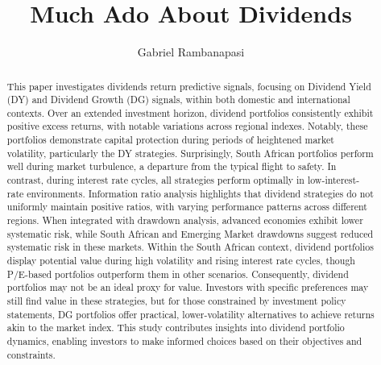 \documentclass[11pt,preprint, authoryear]{elsarticle}
\numberwithin{equation}{section}
\numberwithin{figure}{section}
\numberwithin{table}{section}
\begin{document}
\begin{frontmatter}  %

\title{Much Ado About Dividends}





\author[Add1]{Gabriel Rambanapasi}





\address[Add1]{Stellenbosch University, Cape Town, South Africa}


\begin{abstract}
\small{
This paper investigates dividends return predictive signals, focusing on
Dividend Yield (DY) and Dividend Growth (DG) signals, within both
domestic and international contexts. Over an extended investment
horizon, dividend portfolios consistently exhibit positive excess
returns, with notable variations across regional indexes. Notably, these
portfolios demonstrate capital protection during periods of heightened
market volatility, particularly the DY strategies. Surprisingly, South
African portfolios perform well during market turbulence, a departure
from the typical flight to safety. In contrast, during interest rate
cycles, all strategies perform optimally in low-interest-rate
environments. Information ratio analysis highlights that dividend
strategies do not uniformly maintain positive ratios, with varying
performance patterns across different regions. When integrated with
drawdown analysis, advanced economies exhibit lower systematic risk,
while South African and Emerging Market drawdowns suggest reduced
systematic risk in these markets. Within the South African context,
dividend portfolios display potential value during high volatility and
rising interest rate cycles, though P/E-based portfolios outperform them
in other scenarios. Consequently, dividend portfolios may not be an
ideal proxy for value. Investors with specific preferences may still
find value in these strategies, but for those constrained by investment
policy statements, DG portfolios offer practical, lower-volatility
alternatives to achieve returns akin to the market index. This study
contributes insights into dividend portfolio dynamics, enabling
investors to make informed choices based on their objectives and
constraints.
}
\end{abstract}

\vspace{1cm}





\vspace{0.5cm}

\end{frontmatter}
\end{document}
